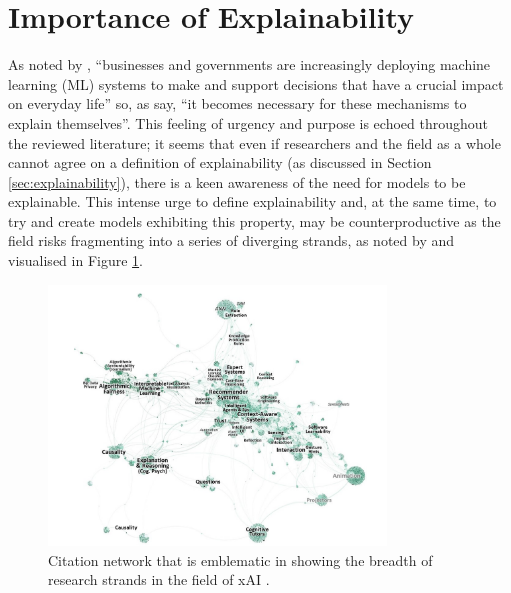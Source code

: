 \section{Importance of Explainability} \label{sec:importance-of-explainability}
As noted by \citet{edwards2018enslaving}, \enquote{businesses and governments are increasingly deploying machine learning (ML) systems to make and support decisions that have a crucial impact on everyday life} so, as \citet{gilpin2018explaining} say, \enquote{it becomes necessary for these mechanisms to explain themselves}.
This feeling of urgency and purpose is echoed throughout the reviewed literature; it seems that even if researchers and the field as a whole cannot agree on a definition of explainability (as discussed in Section \ref{sec:explainability}), there is a keen awareness of the need for models to be explainable.
This intense urge to define explainability and, at the same time, to try and create models exhibiting this property, may be counterproductive as the field risks fragmenting into a series of diverging strands, as noted by \citet{abdul2018trends} and visualised in Figure \ref{fig:xai-citation-network}.

\begin{figure}[htbp]
\centerline{\includegraphics[width=0.8\textwidth]{literature-review/images/xai-citation-network}}
\caption{Citation network that is emblematic in showing the breadth of research strands in the field of xAI \citep{abdul2018trends}.}
\label{fig:xai-citation-network}
\end{figure}

